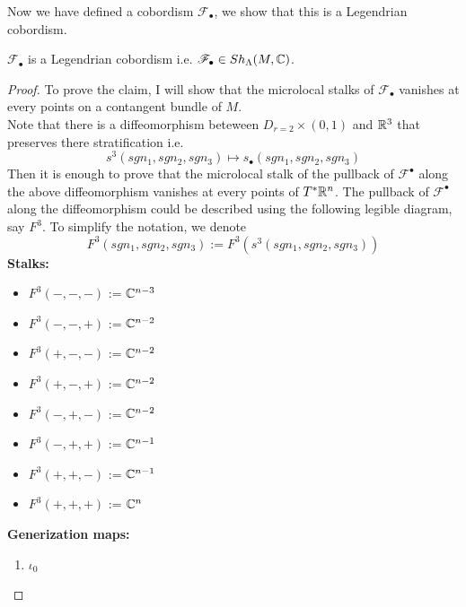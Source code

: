 Now we have defined a cobordism $\mathscr{F}_\bullet$, we show that this is a Legendrian cobordism.
\begin{proposition}
$\mathscr{F}_\bullet$ is a Legendrian cobordism i.e. $\mathscr{F}_\bullet \in Sh_\Lambda(M,\mathbb{C})$.
\end{proposition}
\begin{proof}
To prove the claim, I will show that the microlocal stalks of $\mathscr{F}_\bullet$ vanishes at every points on a contangent bundle of $M$.\\
Note that there is a diffeomorphism beteween $D_{r=2} \times (0,1)$ and $\mathbb{R}^3$ that preserves there stratification i.e.
\[
s^3(sgn_1,sgn_2,sgn_3) \mapsto s_\bullet(sgn_1,sgn_2,sgn_3)
\]
Then it is enough to prove that the microlocal stalk of the pullback of $\mathscr{F}^\bullet$ along the above diffeomorphism vanishes at every points of $T^*\mathbb{R}^n$. The pullback of $\mathscr{F}^\bullet$ along the diffeomorphism could be described using the following legible diagram, say $F^3$. To simplify the notation, we denote
\[
F^3(sgn_1,sgn_2,sgn_3):= F^3(s^3(sgn_1,sgn_2,sgn_3))
\]
\textbf{Stalks:}
\begin{itemize}
\item $F^3(-,-,-)$ := $\mathbb{C}^{n-3}$
\item $F^3(-,-,+)$ := $\mathbb{C}^{n-2}$
\item $F^3(+,-,-)$ := $\mathbb{C}^{n-2}$
\item $F^3(+,-,+)$ := $\mathbb{C}^{n-2}$
\item $F^3(-,+,-)$ := $\mathbb{C}^{n-2}$
\item $F^3(-,+,+)$ := $\mathbb{C}^{n-1}$
\item $F^3(+,+,-)$ := $\mathbb{C}^{n-1}$
\item $F^3(+,+,+)$ := $\mathbb{C}^{n}$
\end{itemize}

\textbf{Generization maps:}\\
\begin{enumerate}[label = (\arabic*)]
\item $\iota_0$


\end{enumerate}
\end{proof}
